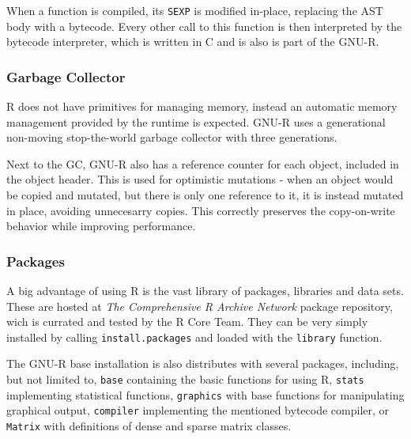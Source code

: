 When a function is compiled, its \texttt{SEXP} is modified in-place, replacing the AST body with a bytecode. Every other call to this function is then interpreted by the bytecode interpreter, which is written in C and is also is part of the GNU-R.



\subsubsection*{Garbage Collector}
R does not have primitives for managing memory, instead an automatic memory management provided by the runtime is expected. GNU-R uses a generational non-moving stop-the-world garbage collector with three generations\cite{r-gc-notes}.

Next to the GC, GNU-R also has a reference counter for each object, included in the object header. This is used for optimistic mutations - when an object would be copied and mutated, but there is only one reference to it, it is instead mutated in place, avoiding unnecesarry copies. This correctly preserves the copy-on-write behavior while improving performance.

\subsubsection*{Packages}

A big advantage of using R is the vast library of packages, libraries and data sets. These are hosted at \textit{The Comprehensive R Archive Network}\cite{cran} package repository, wich is currated and tested by the R Core Team. They can be very simply installed by calling \texttt{install.packages} and loaded with the \texttt{library} function.

The GNU-R base installation is also distributes with several packages, including, but not limited to, \texttt{base} containing the basic functions for using R, \texttt{stats} implementing statistical functions, \texttt{graphics} with base functions for manipulating graphical output, \texttt{compiler} implementing the mentioned bytecode compiler, or \texttt{Matrix} with definitions of dense and sparse matrix classes.

